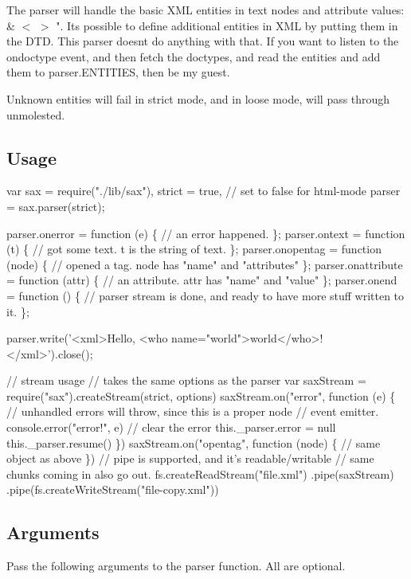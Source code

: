 The parser will handle the basic X\+ML entities in text nodes and attribute values\+: {\ttfamily \& $<$ $>$ \textquotesingle{} "}. It\textquotesingle{}s possible to define additional entities in X\+ML by putting them in the D\+TD. This parser doesn\textquotesingle{}t do anything with that. If you want to listen to the {\ttfamily ondoctype} event, and then fetch the doctypes, and read the entities and add them to {\ttfamily parser.\+E\+N\+T\+I\+T\+I\+ES}, then be my guest.

Unknown entities will fail in strict mode, and in loose mode, will pass through unmolested.

\subsection*{Usage}


\begin{DoxyCode}
var sax = require("./lib/sax"),
  strict = true, // set to false for html-mode
  parser = sax.parser(strict);

parser.onerror = function (e) \{
  // an error happened.
\};
parser.ontext = function (t) \{
  // got some text.  t is the string of text.
\};
parser.onopentag = function (node) \{
  // opened a tag.  node has "name" and "attributes"
\};
parser.onattribute = function (attr) \{
  // an attribute.  attr has "name" and "value"
\};
parser.onend = function () \{
  // parser stream is done, and ready to have more stuff written to it.
\};

parser.write('<xml>Hello, <who name="world">world</who>!</xml>').close();

// stream usage
// takes the same options as the parser
var saxStream = require("sax").createStream(strict, options)
saxStream.on("error", function (e) \{
  // unhandled errors will throw, since this is a proper node
  // event emitter.
  console.error("error!", e)
  // clear the error
  this.\_parser.error = null
  this.\_parser.resume()
\})
saxStream.on("opentag", function (node) \{
  // same object as above
\})
// pipe is supported, and it's readable/writable
// same chunks coming in also go out.
fs.createReadStream("file.xml")
  .pipe(saxStream)
  .pipe(fs.createWriteStream("file-copy.xml"))
\end{DoxyCode}


\subsection*{Arguments}

Pass the following arguments to the parser function. All are optional.

